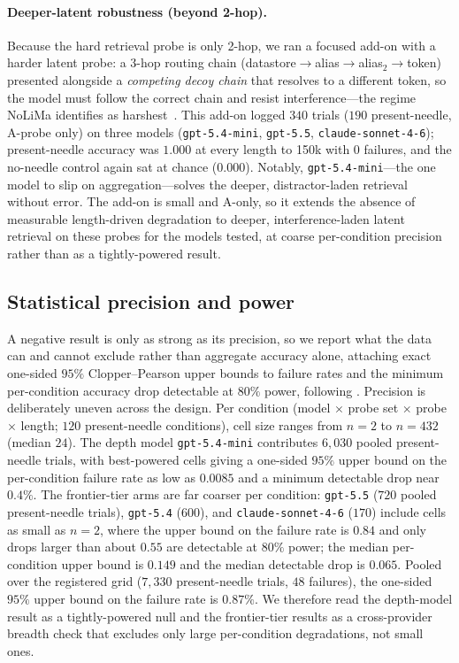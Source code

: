 \documentclass[11pt]{article}
\begin{document}
\paragraph{Deeper-latent robustness (beyond 2-hop).}
Because the hard retrieval probe is only 2-hop, we ran a focused add-on with a
harder latent probe: a $3$-hop routing chain
(\textsf{datastore}$\to$\textsf{alias}$\to$\textsf{alias}$_2\to$\textsf{token})
presented alongside a \emph{competing decoy chain} that resolves to a different
token, so the model must follow the correct chain and resist interference---the
regime NoLiMa identifies as harshest~\cite{modarressi2025nolima}. This add-on
logged $340$ trials ($190$ present-needle, A-probe only) on three models
(\texttt{gpt-5.4-mini}, \texttt{gpt-5.5}, \texttt{claude-sonnet-4-6});
present-needle accuracy was $1.000$ at every length to 150k with $0$ failures,
and the no-needle control again sat at chance ($0.000$). Notably,
\texttt{gpt-5.4-mini}---the one model to slip on aggregation---solves the
deeper, distractor-laden retrieval without error. The add-on is small and
A-only, so it extends the absence of measurable length-driven degradation to
deeper, interference-laden latent retrieval on these probes for the models
tested, at coarse per-condition precision rather than as a tightly-powered
result.

\subsection{Statistical precision and power}
\label{sec:results:precision}
A negative result is only as strong as its precision, so we report what the data can and
cannot exclude rather than aggregate accuracy alone, attaching exact one-sided $95\%$
Clopper--Pearson upper bounds to failure rates and the minimum per-condition accuracy drop
detectable at $80\%$ power, following \citet{miller2024errorbars}. Precision is deliberately
uneven across the design. Per condition (model $\times$ probe set $\times$ probe $\times$
length; $120$ present-needle conditions), cell size ranges from $n=2$ to $n=432$ (median $24$).
The depth model \texttt{gpt-5.4-mini} contributes $6{,}030$ pooled present-needle trials, with
best-powered cells giving a one-sided $95\%$ upper bound on the per-condition failure rate as
low as $0.0085$ and a minimum detectable drop near $0.4\%$. The frontier-tier arms are far
coarser per condition: \texttt{gpt-5.5} ($720$ pooled present-needle trials), \texttt{gpt-5.4}
($600$), and \texttt{claude-sonnet-4-6} ($170$) include cells as small as $n=2$, where the
upper bound on the failure rate is $0.84$ and only drops larger than about $0.55$ are
detectable at $80\%$ power; the median per-condition upper bound is $0.149$ and the median
detectable drop is $0.065$. Pooled over the registered grid ($7{,}330$ present-needle trials,
$48$ failures), the one-sided $95\%$ upper bound on the failure rate is $0.87\%$. We therefore
read the depth-model result as a tightly-powered null and the frontier-tier results as a
cross-provider breadth check that excludes only large per-condition degradations, not small ones.
\end{document}
